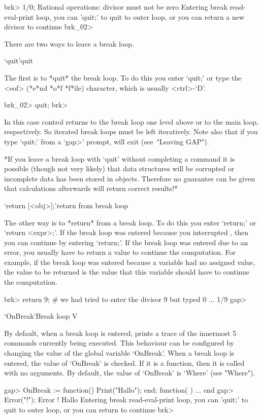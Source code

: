\begintt
brk> 1/0;
Rational operations: divisor must not be zero
Entering break read-eval-print loop, you can 'quit;' to quit to outer loop,
or you can return a new divisor to continue
brk_02> 
\endtt

There are two ways to leave a break loop.

\>`quit'{quit}

The first is to *quit* the break loop.
To do this you enter `quit;' or type the <eof> (*e*nd *o*f *f*ile) character,
which is usually <ctrl>-`D'.

\begintt
brk_02> quit;
brk>
\endtt

In this case control returns to the break loop one level above or
to the main loop, respectively.
So iterated break loops must be left iteratively.
Note also that if you type `quit;' from a `gap>' prompt, {\GAP} will exit
(see~"Leaving GAP").

*If you leave a break loop with `quit' without completing a command
it is possible (though not very likely) that data structures
will be corrupted or incomplete data has been stored in objects.
Therefore no guarantee can be given that calculations afterwards
will return correct results!*

\>`return [<obj>];'{return from break loop}

The other way is to *return* from a break loop. To do this you enter
`return;' or `return <expr>;'.
If the break loop was entered because you interrupted {\GAP},
then you can continue by entering `return;'.
If the break loop was entered due to an error,
you usually have to return a value to continue the computation.
For example, if the break loop was entered because a variable had no
assigned value, the value to be returned is the value that this variable
should have to continue the computation.

\begintt
brk> return 9;  # we had tried to enter the divisor 9 but typed 0 ...
1/9
gap>
\endtt

\>`OnBreak'{Break loop} V

By default, when a break loop is entered, {\GAP} prints a trace of the 
innermost 5 commands currently being executed. This behaviour can be
configured by changing the value of the global variable
`OnBreak'. When a break loop is entered, the value of `OnBreak' is
checked. If it is a function, then it is called with no arguments. By
default, the value of `OnBreak' is `Where' (see "Where").

\begintt
gap> OnBreak := function() Print("Hallo\n"); end;
function(  ) ... end
gap> Error("!");
Error !
Hallo
Entering break read-eval-print loop, you can 'quit;' to quit to outer loop,
or you can return to continue
brk> 
\endtt


